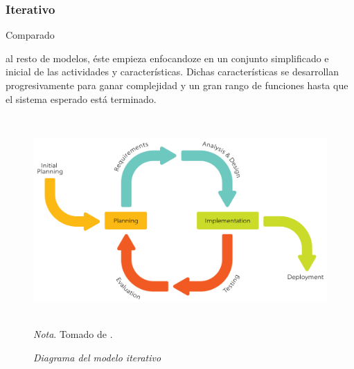 \documentclass[stu, 12pt, letterpaper, donotrepeattitle, floatsintext, natbib]{apa7}
\begin{document}
\subsubsection{Iterativo}
Comparado \begin{justifying}
    al resto de modelos, éste empieza enfocandoze en un conjunto simplificado e inicial de las actividades y características. Dichas características se desarrollan
    progresivamente para ganar complejidad y un gran rango de funciones hasta que el sistema esperado está terminado.\par
\end{justifying}
\begin{figure}[H]
    \caption{\emph{Diagrama del modelo iterativo\\}}
    \centering
    \smallskip
    \includegraphics[width=12cm, height=8cm]{iterative.png}
    \bigskip
    \justifying\small\textit{Nota}. Tomado de \cite{wikipedia-contributors-2021}. %
\end{figure}
\vspace{\baselineskip}
\end{document}
